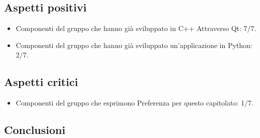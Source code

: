 \subsection{Aspetti positivi}
\begin{itemize}
\item Componenti del gruppo che hanno già sviluppato in C++ Attraverso Qt: 7/7.
\item Componenti del gruppo che hanno già sviluppato un'applicazione in Python: 2/7.
\end{itemize}

\subsection{Aspetti critici}
\begin{itemize}
\item Componenti del gruppo che esprimono Preferenza per questo capitolato: 1/7.
\end{itemize}

\subsection{Conclusioni}